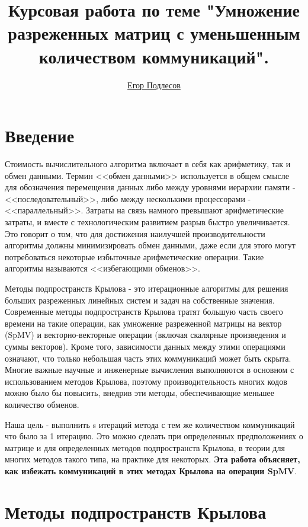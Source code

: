\documentclass[a4paper,12pt]{report}
\author{\href{https://github.com/ypodlesov}{Егор Подлесов}}
\title{\textbf{Курсовая работа по теме "Умножение разреженных матриц с уменьшенным количеством коммуникаций".}}
\begin{document}
    \maketitle
    \clearpage
    \tableofcontents

    \chapter{ Введение }

    Стоимость вычислительного алгоритма включает в себя как арифметику, так и обмен данными. Термин <<обмен данными>> используется в общем смысле для обозначения перемещения данных либо между уровнями иерархии памяти - <<последовательный>>, либо между несколькими процессорами - <<параллельный>>. Затраты на связь намного превышают арифметические затраты, и вместе с технологическим развитием разрыв быстро увеличивается. Это говорит о том, что для достижения наилучшей производительности алгоритмы должны минимизировать обмен данными, даже если для этого могут потребоваться некоторые избыточные арифметические операции. Такие алгоритмы называются <<избегающими обменов>>.

    Методы подпространств Крылова - это итерационные алгоритмы для решения больших разреженных линейных систем и задач на собственные значения. Современные методы подпространств Крылова тратят большую часть своего времени на такие операции, как умножение разреженной матрицы на вектор (SpMV) и векторно-векторные операции (включая скалярные произведения и суммы векторов). Кроме того, зависимости данных между этими операциями означают, что только небольшая часть этих коммуникаций может быть скрыта. Многие важные научные и инженерные вычисления выполняются в основном с использованием методов Крылова, поэтому производительность многих кодов можно было бы повысить, внедрив эти методы, обеспечивающие меньшее количество обменов.

    Наша цель - выполнить s итераций метода с тем же количеством коммуникаций что было за 1 итерацию. Это можно сделать при определенных предположениях о матрице и для определенных методов подпространств Крылова, в теории для многих методов такого типа, на практике для некоторых. \textbf{Эта работа объясняет, как избежать коммуникаций в этих методах Крылова на операции SpMV}.

    \chapter{ Методы подпространств Крылова }
    
\end{document}
